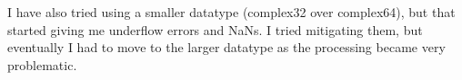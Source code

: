 \documentclass[12pt]{article}
\begin{document}
\begin{enumerate}
    I have also tried using a smaller datatype (complex32 over complex64),
    but that started giving me underflow errors and NaNs. I tried mitigating
    them, but eventually I had to move to the larger datatype as the processing
    became very problematic.
\end{enumerate}

\nocite{*}
\printbibliography
\end{document}
